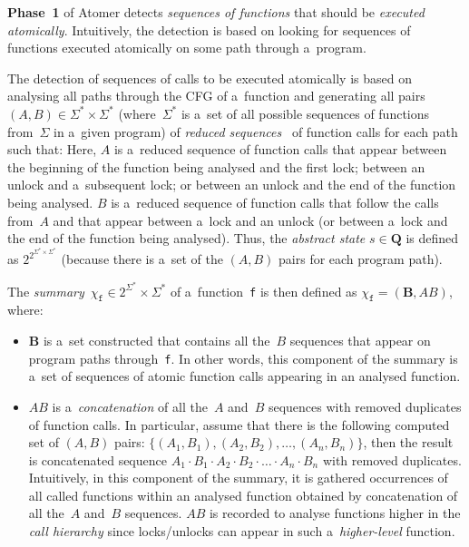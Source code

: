 \documentclass{ExcelAtFIT}
\theoremstyle{definition}
\begin{document}
\textbf{Phase~1} of Atomer detects \emph{sequences of functions} that should be \emph{executed atomically}. Intuitively, the detection is based on looking for sequences of functions executed atomically on some path through a~program.

The detection of sequences of calls to be executed atomically is based on analysing all paths through the CFG of a~function and generating all pairs $ {(A, B)} \in {\Sigma^* \times \Sigma^*} $ (where~$ \Sigma^* $ is a~set of all possible sequences of functions from~$ \Sigma $ in a~given program) of \emph{reduced sequences}~\cite{harmimBP} of function calls for each path such that: Here, $ A $ is a~reduced sequence of function calls that appear between the beginning of the function being analysed and the first lock; between an unlock and a~subsequent lock; or between an unlock and the end of the function being analysed. $ B $ is a~reduced sequence of function calls that follow the calls from~$ A $ and that appear between a~lock and an unlock (or between a~lock and the end of the function being analysed). Thus, the \emph{abstract state} $ s \in \boldsymbol{Q} $ is defined as $ 2^{2^{\Sigma^* \times \Sigma^*}} $ (because there is a~set of the ${ (A, B) }$ pairs for each program path).

The \emph{summary}~$ \chi_\mathtt{f} \in 2^{\Sigma^*} \times \Sigma^* $ of a~function~\texttt{f} is then defined as $ \chi_\mathtt{f} = (\boldsymbol{B}, AB) $, where:
\vspace{-.5em}
\begin{itemize}
    \item $ \boldsymbol{B} $ is a~set constructed that contains all the~$ B $ sequences that appear on program paths through~\texttt{f}. In other words, this component of the summary is a~set of sequences of atomic function calls appearing in an analysed function.

    \item $ AB $ is a~\emph{concatenation} of all the~$ A $ and~$ B $ sequences with removed duplicates of function calls. In particular, assume that there is the following computed set of ${ (A, B) }$ pairs: $ \{{(A_1, B_1)}, \allowbreak {(A_2, B_2)}, \ldots, {(A_n, B_n)}\} $, then the result is concatenated sequence $ A_1 \cdot B_1 \cdot A_2 \cdot B_2 \cdot \ldots \cdot A_n \cdot B_n $ with removed duplicates. Intuitively, in this component of the summary, it is gathered occurrences of all called functions within an analysed function obtained by concatenation of all the~$ A $ and~$ B $ sequences. $ AB $ is recorded to analyse functions higher in the \emph{call hierarchy} since locks/unlocks can appear in such a~\emph{higher-level} function.
\end{itemize}
\vspace{-1em}
\end{document}

